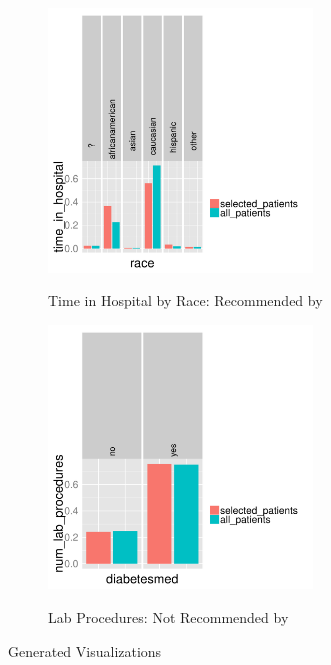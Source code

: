 \begin{figure}[h] 
\centering
\begin{subfigure}{0.8\linewidth}
\centering
{\includegraphics[width=7cm] {Images/seedb_dim_race_measure_time_in_hospital.pdf}}
\caption{Time in Hospital by Race: Recommended by \VizRecDB}
\label{fig:time-in-hospital}
\end{subfigure}
\begin{subfigure}{0.8\linewidth}
\centering
{\includegraphics[width=7cm] {Images/seedb_dim_diabetesmed_measure_num_lab_procedures.pdf}}
\caption{Lab Procedures: Not Recommended by \VizRecDB}
\label{fig:lab-procedures}
\end{subfigure}
\vspace{-10pt}
\caption{\VizRecDB Generated Visualizations}\label{fig:qual-study}

\vspace{-10pt}
\end{figure}

